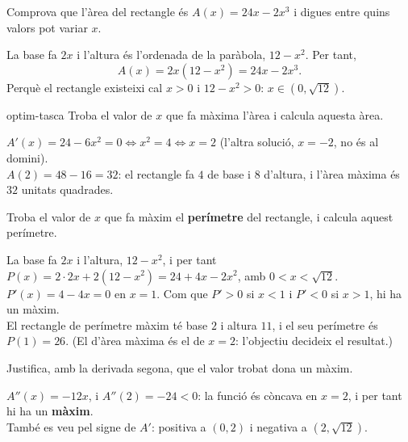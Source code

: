 \begin{apartats}

Comprova que l'àrea del rectangle és $A(x)=24x-2x^3$ i digues entre quins valors pot variar
$x$.

\begin{solucio}
La base fa $2x$ i l'altura és l'ordenada de la paràbola, $12-x^2$. Per tant,
\[
A(x)=2x\left(12-x^2\right)=24x-2x^3 .
\]
Perquè el rectangle existeixi cal $x>0$ i $12-x^2>0$: $x\in\left(0,\sqrt{12}\right)$.
\end{solucio}

\begin{tria}{optim-tasca}
Troba el valor de $x$ que fa màxima l'àrea i calcula aquesta àrea.

\begin{solucio}
$A'(x)=24-6x^2=0\iff x^2=4\iff x=2$ (l'altra solució, $x=-2$, no és al domini).\\
$A(2)=48-16=32$: el rectangle fa $4$ de base i $8$ d'altura, i l'àrea màxima és
$\boxed{32}$ unitats quadrades.
\end{solucio}

Troba el valor de $x$ que fa màxim el \textbf{perímetre} del rectangle, i calcula aquest
perímetre.

\begin{solucio}
La base fa $2x$ i l'altura, $12-x^2$, i per tant $P(x)=2\cdot2x+2\left(12-x^2\right)=24+4x-2x^2$,
amb $0<x<\sqrt{12}$.\\
$P'(x)=4-4x=0$ en $x=1$. Com que $P'>0$ si $x<1$ i $P'<0$ si $x>1$, hi ha un màxim.\\
El rectangle de perímetre màxim té base $2$ i altura $11$, i el seu perímetre és $P(1)=26$. (El
d'àrea màxima és el de $x=2$: l'objectiu decideix el resultat.)
\end{solucio}
\end{tria}

\begin{nomesllarg}
Justifica, amb la derivada segona, que el valor trobat dona un màxim.

\begin{solucio}
$A''(x)=-12x$, i $A''(2)=-24<0$: la funció és còncava en $x=2$, i per tant hi ha un
\textbf{màxim}.\\
També es veu pel signe de $A'$: positiva a $(0,2)$ i negativa a $\left(2,\sqrt{12}\right)$.
\end{solucio}
\end{nomesllarg}

\end{apartats}
